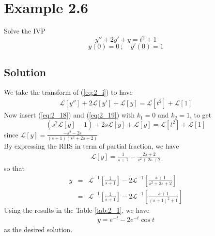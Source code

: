 \documentclass[11pt]{report}
\newcommand{\Laplace}{\mathcal{L}}
\newcommand{\sbracket}[1]{\left[#1\right]}
\newcommand{\Ly}{\Laplace \sbracket{y}}
\newcommand{\LFn}[1]{\Laplace \sbracket{#1}}
\newcommand{\InverseL}[1]{\Laplace^{-1}\left[#1\right]}
\newcommand{\sps}{\\[0.2cm]}
\newcommand{\refn}[1]{(\ref{#1})}
\newcommand{\refx}[1]{\refn{eq:#1}}
\newcommand{\dsp}{\displaystyle}
\newcommand{\sprime}{'}
\newcommand{\dprime}{''}
\begin{document}
	\section*{Example 2.6}
	Solve the IVP
	\begin{equation}
		 y\dprime + 2y\sprime + y = t^2 + 1\tag{i} \label{eq:2_i}
	\end{equation}
	\begin{equation}
		y(0)=0~;\quad y\sprime(0)=1 \tag{ii}\label{eq:2_ii}
	\end{equation}
	
	\subsection*{Solution}
	We take the transform of \refx{2_i} to have 
	\begin{eqnarray*}
		\LFn{y\dprime} + 2 \LFn{y\sprime} + \LFn{y} = \LFn{t^2}+ \LFn{1}
	\end{eqnarray*}
	Now insert \refx{2_18} and \refx{2_19} with $k_1=0$ and $k_2=1$, to get
	\begin{equation*}
		(s^2\LFn{y}-1)+ 2s\LFn{y} + \LFn{y} = \LFn{t^2} + \LFn{1}
	\end{equation*}
	since $\dsp\LFn{y} = \frac{-s^2-2s}{(s+1)(s^2+2s+2)}$\sps
	By expressing the RHS in term of partial fraction, we have
	\begin{eqnarray*}
		\Ly = \frac{1}{s+1} -\frac{2s+2}{s^2+2s+2}
	\end{eqnarray*}
	so that
	\begin{eqnarray*}
		y&=&\InverseL{\frac{1}{s+1}} - 2\InverseL{\frac{s+1}{s^2+2s+2}}\sps
		&=&\InverseL{\frac{1}{s+1}} - 2\InverseL{\frac{s+1}{(s+1)^2 +1}}
	\end{eqnarray*}
	Using the results in the Table \ref{tab:2_1}, we have
	\begin{eqnarray*}
		y=e^{-t} - 2e^{-t}\cos t
	\end{eqnarray*}
	as the desired solution.
	
\end{document}
